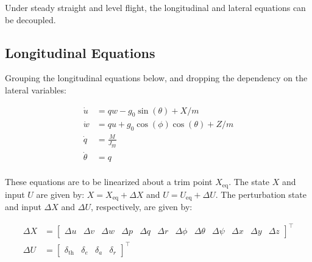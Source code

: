 Under steady straight and level flight, the longitudinal and lateral equations can be decoupled.

\subsection{Longitudinal Equations}

Grouping the longitudinal equations below, and dropping the dependency on the lateral variables:

\begin{equation*}
  \begin{split}
    \dot{u}&=qw-g_{0}\sin(\theta)+X/m \\
    \dot{w}&=qu+g_{0}\cos(\phi)\cos(\theta)+Z/m \\
    \dot{q}&=\frac{M}{J_{yy}} \\
    \dot{\theta}&=q \\
  \end{split}
\end{equation*}

%

These equations are to be linearized about a trim point $X_{\text{eq}}$.
The state $X$ and input $U$ are given by: $X=X_{\text{eq}}+\Delta X$ and $U=U_{\text{eq}}+\Delta U$.
The perturbation state and input $\Delta X$ and $\Delta U$, respectively, are given by:

\begin{equation*}
  \begin{split}
    \Delta X&=
    \left[
      \begin{array}{cccccccccccc}
      \Delta u & \Delta v & \Delta w & \Delta p & \Delta q & \Delta r &\Delta \phi & \Delta \theta & \Delta \psi & \Delta x & \Delta y & \Delta z
      \end{array}
    \right]^{\top} \\
    \Delta{}U&=
    \left[
      \begin{array}{cccc}
      \delta_{\text{th}} & \delta_{e} & \delta_{a} & \delta_{r}
      \end{array}
    \right]^{\top} \\
  \end{split}
\end{equation*}

